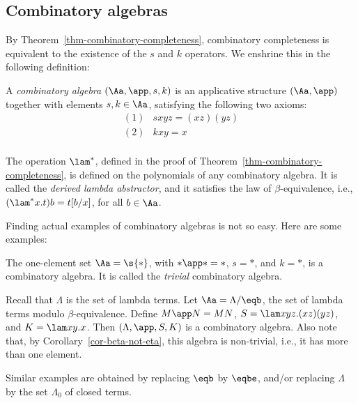 \documentclass[12pt]{article}
\begin{document}
\subsection{Combinatory algebras}\label{ssec-comb-alg}

By Theorem~\ref{thm-combinatory-completeness}, combinatory
completeness is equivalent to the existence of the $s$ and $k$
operators. We enshrine this in the following definition:

\begin{definition}
  A {\em combinatory algebra} $(\Aa,\app,s,k)$ is an applicative
  structure $(\Aa,\app)$ together with elements $s,k\in\Aa$,
  satisfying the following two axioms:
    \[ \begin{array}{ll}
    (1) & sxyz = (xz)(yz) \\
    (2) & kxy = x \\
  \end{array}
  \]
\end{definition}

\begin{remark}\label{rem-derived-lambda}
  The operation $\lam^*$, defined in the proof of
  Theorem~\ref{thm-combinatory-completeness}, is defined on the
  polynomials of any combinatory algebra. It is called the {\em derived
    lambda abstractor}, and it satisfies the law of $\beta$-equivalence,
  i.e., $(\lam^*x.t)b = t[b/x]$, for all $b\in\Aa$.
\end{remark}

Finding actual examples of combinatory algebras is not so easy. Here
are some examples:

\begin{example}
  The one-element set $\Aa=\s{*}$, with $*\app *=*$, $s=*$, and $k=*$,
  is a combinatory algebra. It is called the {\em trivial} combinatory
  algebra. 
\end{example}

\begin{example}
  Recall that $\Lambda$ is the set of lambda terms. Let
  $\Aa=\Lambda/{\eqb}$, the set of lambda terms modulo
  $\beta$-equivalence. Define $M\app N=MN$, $S=\lam xyz.(xz)(yz)$,
  and $K=\lam xy.x$. Then $(\Lambda,\app,S,K)$ is a combinatory
  algebra. Also note that, by Corollary~\ref{cor-beta-not-eta}, this
  algebra is non-trivial, i.e., it has more than one element.
  
  Similar examples are obtained by replacing $\eqb$ by $\eqbe$, and/or
  replacing $\Lambda$ by the set $\Lambda_0$ of closed terms.
\end{example}
\end{document}
